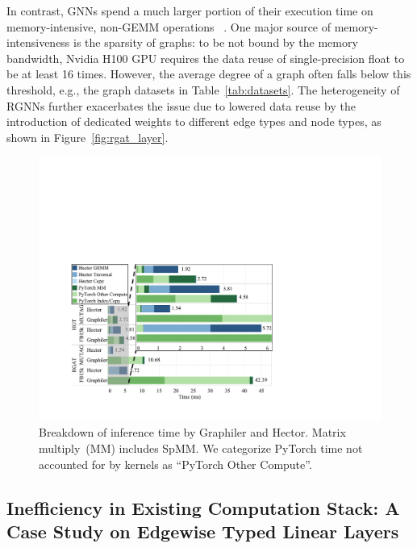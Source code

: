 In contrast, GNNs spend a much larger portion of their execution time on memory-intensive, non-GEMM operations ~\cite{wangEmpiricalAnalysisPerformance2021, zhengNatureGraphNeural2021}. One major source of memory-intensiveness is the sparsity of graphs: to be not bound by the memory {bandwidth}, Nvidia H100 GPU requires the data reuse of single-precision float to be {at least} 16 times. However, the average degree of a graph often falls below this threshold, e.g., the graph datasets in Table~\ref{tab:datasets}. The heterogeneity of RGNNs further exacerbates the issue due to lowered data reuse by the introduction of dedicated weights to different edge types and node types, as shown in Figure~\ref{fig:rgat_layer}. 





\begin{figure}[!t]
\centering
\includegraphics[width=\linewidth]{figures/Hector/BreakdownBGv3.pdf}
\caption{\label{fig:bg_breakdown} Breakdown of inference time by Graphiler and Hector. Matrix multiply~(MM) includes SpMM. We categorize PyTorch time not accounted for by kernels as ``PyTorch Other Compute''.} 
\end{figure}




\subsection{Inefficiency in Existing Computation Stack: A Case Study on Edgewise Typed Linear Layers}
\label{sec:segmentmm}

